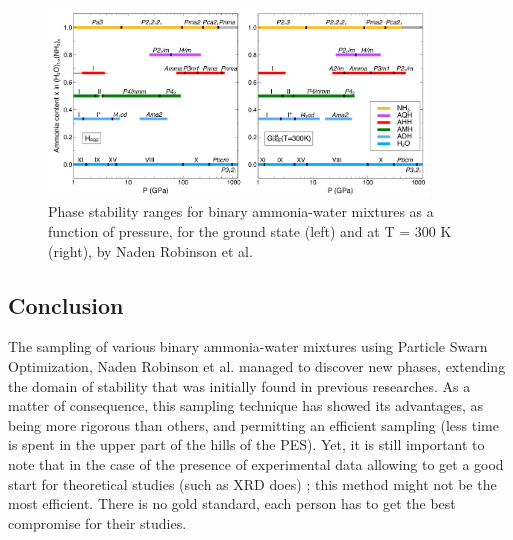 \documentclass[11pt]{article}
\begin{document}
\begin{figure}[h]
    \centering
    \includegraphics[width=0.9\textwidth]{figures/phase-diagram.png}
    \caption{Phase stability ranges for binary ammonia-water mixtures as a function of pressure, for the ground state (left) and at T = 300 K (right), by Naden Robinson et al. \cite{original}}
\end{figure}
\begin{multicols}{2}

\section*{Conclusion}
The sampling of various binary ammonia-water mixtures using Particle Swarn Optimization, Naden Robinson et al. managed to discover new phases, extending the domain of stability that was initially found in previous researches. As a matter of consequence, this sampling technique has showed its advantages, as being more rigorous than others, and permitting an efficient sampling (less time is spent in the upper part of the hills of the PES). Yet, it is still important to note that in the case of the presence of experimental data allowing to get a good start for theoretical studies (such as XRD does) ; this method might not be the most efficient. There is no gold standard, each person has to get the best compromise for their studies.
\end{multicols}


\end{document}
